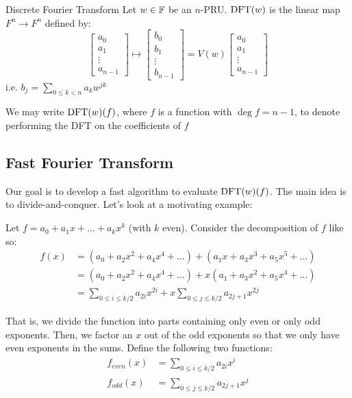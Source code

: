 \begin{definition}{Discrete Fourier Transform}{}
    Let $w \in \operatorname{\mathbb{F}}$ be an $n$-PRU. $\operatorname{DFT}(w)$ is the linear map $F^n \rightarrow F^n$ defined by:
    \begin{equation}
        \begin{bmatrix}
            a_0 \\ a_1 \\ \vdots \\ a_{n-1}
        \end{bmatrix}
        \longmapsto
        \begin{bmatrix}
            b_0 \\ b_1 \\ \vdots \\ b_{n-1}
        \end{bmatrix}
        =
        V(w)
        \begin{bmatrix}
            a_0 \\ a_1 \\ \vdots \\ a_{n-1}
        \end{bmatrix}
    \end{equation}
    i.e. $b_j = \sum_{0 \leq k < n} a_kw^{jk}$
\end{definition}
\begin{note}
    We may write $\operatorname{DFT}(w)(f)$, where $f$ is a function with $\deg f = n - 1$, to denote performing the DFT on the coefficients of $f$
\end{note}

\subsection{Fast Fourier Transform}
Our goal is to develop a fast algorithm to evaluate $\operatorname{DFT}(w)(f)$.
The main idea is to divide-and-conquer.
Let's look at a motivating example:

Let $f = a_0 + a_1x + \ldots + a_kx^k$ (with $k$ even).
Consider the decomposition of $f$ like so:
\begin{align*}
    f(x) &= (a_0 + a_2x^2 + a_4x^4 + \ldots) + (a_1x + a_3x^3 + a_5x^5 + \ldots) \\
    &= (a_0 + a_2x^2 + a_4x^4 + \ldots) + x(a_1 + a_3x^2 + a_5x^4 + \ldots) \\
    &= \sum_{0 \leq i \leq k/2} a_{2i}x^{2i} + x\sum_{0 \leq j \leq k/2} a_{2j + 1}x^{2j}
\end{align*}

That is, we divide the function into parts containing only even or only odd exponents.
Then, we factor an $x$ out of the odd exponents so that we only have even exponents in the sums.
Define the following two functions:
\begin{align}
    f_{even}(x) &= \sum_{0 \leq i \leq k/2} a_{2i}x^{i} \\
    f_{odd}(x) &= \sum_{0 \leq j \leq k/2} a_{2j + 1}x^{j}
\end{align}

